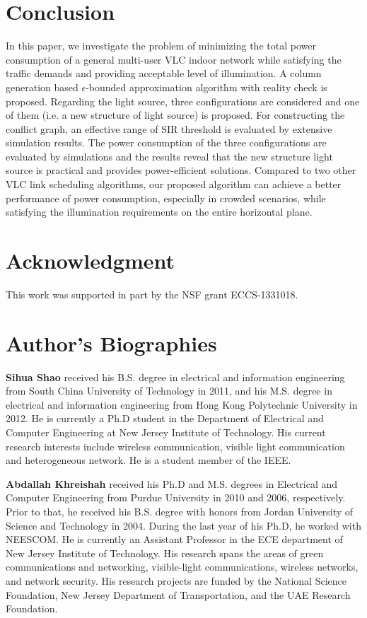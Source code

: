 \documentclass[10pt,journal]{IEEEtran}
\begin{document}
\section{Conclusion}\label{conclusion}
In this paper, we investigate the problem of minimizing the total power consumption of a general multi-user VLC indoor network while satisfying the traffic demands and providing acceptable level of illumination. A column generation based $\epsilon$-bounded approximation algorithm with reality check is proposed. Regarding the light source, three configurations are considered and one of them (i.e. a new structure of light source) is proposed. For constructing the conflict graph, an effective range of SIR threshold is evaluated by extensive simulation results. The power consumption of the three configurations are evaluated by simulations and the results reveal that the new structure light source is practical and provides power-efficient solutions. Compared to two other VLC link scheduling algorithms, our proposed algorithm can achieve a better performance of power consumption, especially in crowded scenarios, while satisfying the illumination requirements on the entire horizontal plane.

\section*{Acknowledgment}
This work was supported in part by the NSF grant ECCS-1331018.




\section*{Author's Biographies}
\textbf{Sihua Shao} received his B.S. degree in electrical and information engineering from South China University of Technology in 2011, and his M.S. degree in electrical and information engineering from Hong Kong Polytechnic University in 2012. He is currently a Ph.D student in the Department of Electrical and Computer Engineering at New Jersey Institute of Technology. His current research interests include wireless communication, visible light communication and heterogeneous network. He is a student member of the IEEE.

\textbf{Abdallah Khreishah} received his Ph.D and M.S. degrees in Electrical and Computer Engineering from Purdue University in 2010 and 2006, respectively. Prior to that, he received his B.S. degree with honors from Jordan University of Science and Technology in 2004. During the last year of his Ph.D, he worked with NEESCOM. He is currently an Assistant Professor in the ECE department of New Jersey Institute of Technology. His research spans the areas of green communications and networking, visible-light communications, wireless networks, and network security. His research projects are funded by the National Science Foundation, New Jersey Department of Transportation, and the UAE Research Foundation.
\end{document}
